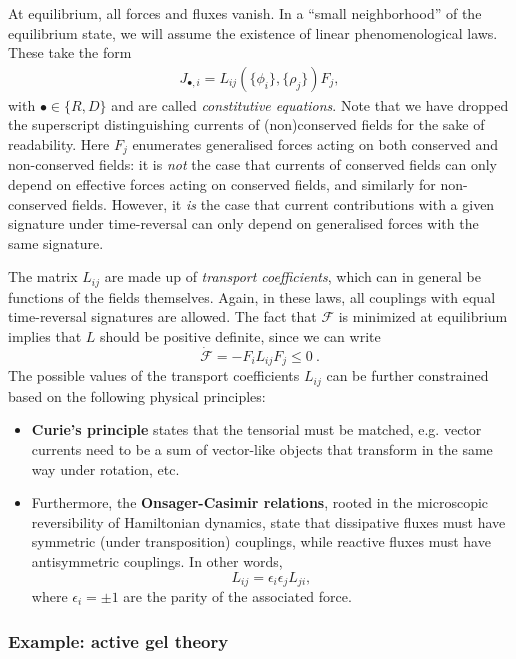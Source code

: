At equilibrium, all forces and fluxes vanish.
In a ``small neighborhood'' of the equilibrium state, we will assume the existence of linear phenomenological laws.
These take the form
%
\begin{align}
    J_{\bullet,i}
    = L_{ij}(\{\phi_i\}, \{\rho_j\}) F_j, 
\end{align}
%
with $\bullet \in \{R,D\}$ and are called \emph{constitutive equations}. Note that we have dropped the superscript distinguishing currents of (non)conserved fields for the sake of readability.
Here $F_j$ enumerates generalised forces acting on both conserved and non-conserved fields: it is \emph{not} the case that currents of conserved fields can only depend on effective forces acting on conserved fields, and similarly for non-conserved fields. However, it \emph{is} the case that current contributions with a given signature under time-reversal can only depend on generalised forces with the same signature. 

The matrix $L_{ij}$ are made up of \emph{transport coefficients}, which can in general be functions of the fields themselves.
Again, in these laws, all couplings with equal time-reversal signatures are allowed.
The fact that $\mathcal{F}$ is minimized at equilibrium implies that $L$ should be positive definite, since we can write
\begin{equation}
    \dot{\mathcal{F}} = - F_i L_{ij} F_j \leq 0~.
\end{equation}
The possible values of the transport coefficients $L_{ij}$ can be further constrained based on the following physical principles:
\begin{itemize}
    \item {\bf Curie's principle} states that the tensorial must be matched, e.g. vector currents need to be a sum of vector-like objects that transform in the same way under rotation, etc.
    \item Furthermore, the {\bf  Onsager-Casimir relations}, rooted in the microscopic reversibility of Hamiltonian dynamics, state that dissipative fluxes must have symmetric (under transposition) couplings, while reactive fluxes must have antisymmetric couplings.
    In other words,
    \begin{equation}
        L_{ij}  = \epsilon_i \epsilon_j L_{ji},
    \end{equation}
    where $\epsilon_i = \pm 1$ are the parity of the associated force.
\end{itemize}

\subsubsection{Example: active gel theory}

